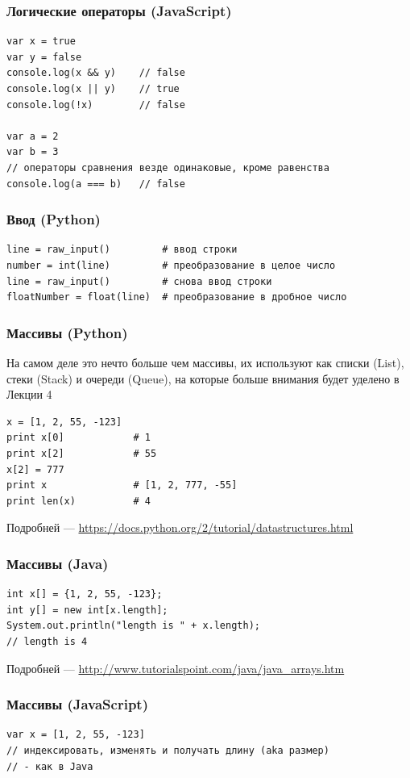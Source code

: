 {\begin{frame}[fragile]
  \frametitle{Логические операторы (JavaScript)}
  \begin{verbatim}
var x = true
var y = false
console.log(x && y)    // false
console.log(x || y)    // true
console.log(!x)        // false

var a = 2
var b = 3
// операторы сравнения везде одинаковые, кроме равенства
console.log(a === b)   // false
  \end{verbatim}
\end{frame}

\begin{frame}[fragile]
  \frametitle{Ввод (Python)}
  \begin{verbatim}
line = raw_input()         # ввод строки
number = int(line)         # преобразование в целое число
line = raw_input()         # снова ввод строки
floatNumber = float(line)  # преобразование в дробное число
  \end{verbatim}
\end{frame}

\begin{frame}[fragile]
  \frametitle{Массивы (Python)}
  На самом деле это нечто больше чем массивы, их используют как списки (List), стеки (Stack)
  и очереди (Queue), на которые больше внимания будет уделено в Лекции 4
  \vspace{0.5cm}
  \begin{verbatim}
x = [1, 2, 55, -123]
print x[0]            # 1
print x[2]            # 55
x[2] = 777
print x               # [1, 2, 777, -55]
print len(x)          # 4
  \end{verbatim}

  \vspace{0.5cm}
  Подробней --- \url{https://docs.python.org/2/tutorial/datastructures.html}
\end{frame}

\begin{frame}[fragile]
  \frametitle{Массивы (Java)}
  \begin{verbatim}
int x[] = {1, 2, 55, -123};
int y[] = new int[x.length];
System.out.println("length is " + x.length);
// length is 4
  \end{verbatim}

  \vspace{0.5cm}
  Подробней --- \url{http://www.tutorialspoint.com/java/java\_arrays.htm}
\end{frame}

\begin{frame}[fragile]
  \frametitle{Массивы (JavaScript)}
  \begin{verbatim}
var x = [1, 2, 55, -123]
// индексировать, изменять и получать длину (aka размер)
// - как в Java
  \end{verbatim}


\end{frame}}
